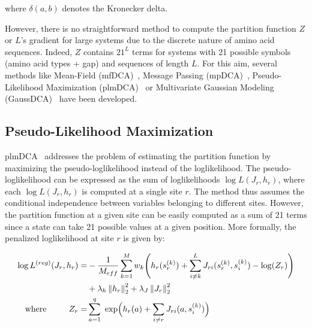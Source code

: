         where $\delta(a, b)$ denotes the Kronecker delta.  %

        However, there is no straightforward method to compute the partition function $Z$ or $L$'s gradient for large
        systems due to the discrete nature of amino acid sequences. Indeed, $Z$ contains $21^L$ terms for systems with 21 possible symbols (amino acid types + gap)
        and sequences of length $L$. For this aim, several methods like Mean-Field (mfDCA)~\cite{MorcosE1293}, Message Passing (mpDCA)~\cite{Weigt2009},
        Pseudo-Likelihood Maximization (plmDCA)~\cite{EKEBERG2014341} or Multivariate Gaussian Modeling (GaussDCA)~\cite{10.1371/journal.pone.0092721}
        have been developed.

    \subsection{Pseudo-Likelihood Maximization}

        plmDCA~\cite{EKEBERG2014341} addresses the problem of estimating
        the partition function by maximizing the pseudo-loglikelihood instead of the loglikelihood.
        The pseudo-loglikelihood can be expressed as the sum of loglikelihoods $\log{L}(J_r, h_r)$,
        where each $\log{L}(J_r, h_r)$ is computed
        at a single site $r$. The method thus assumes the conditional independence between variables belonging to different sites.
        However, the partition function at a given site can be easily computed as a sum of
        21 terms since a state can take 21 possible values at a given position.
        More formally, the penalized loglikelihood at site $r$ is given by:

        \begin{equation}
            \begin{split}
                \log{L^{(reg)}}(J_r, h_r) = & -\frac{1}{M_{eff}} \sum\limits_{k=1}^M w_k \Bigg( h_r(s_r^{(k)})
                    + \sum\limits_{i \neq k}^L J_{ri}(s_r^{(k)}, s_i^{(k)}) - \log(Z_r) \Bigg) \\
                & + \lambda_h \left\lVert h_r\right\rVert_2^2 + \lambda_J \left\lVert J_r\right\rVert_2^2 \\
                \text{where} \ \ \ \ \ \ \ \ Z_r = & \sum\limits_{a=1}^q \text{ exp}\Big(h_r(a) + \sum\limits_{i \neq r} J_{ri}(a, s_i^{(k)})\Big)
            \end{split}
        \end{equation}

